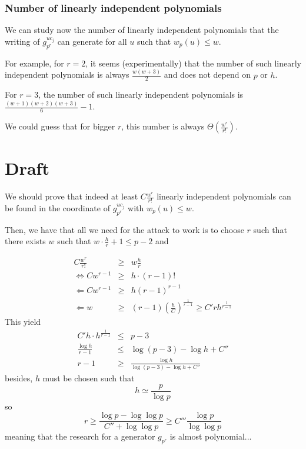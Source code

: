 \documentclass[12pt,a4paper,titlepage]{article}
\begin{document}
\subsubsection{Number of linearly independent polynomials}

We can study now the number of linearly independent polynomials that the writing of $g_{p^r}^{uc_j}$ can generate for all $u$ such that $w_p(u) \leq w$.

For example, for $r = 2$, it seems (experimentally) that the number of such linearly independent polynomials is always $\frac{w(w+3)}{2}$ and does not depend on $p$ or $h$.

For $r = 3$, the number of such linearly independent polynomials is $\frac{(w+1)(w+2)(w+3)}{6}-1$.

We could guess that for bigger $r$, this number is always $\Theta\left(\frac{w^r}{r!}\right)$.


\section{Draft}

We should prove that indeed at least $C\frac{w^r}{r!}$ linearly independent polynomials can be found in the coordinate of $g_{p^r}^{uc_j}$ with $w_p(u) \leq w$.

Then, we have that all we need for the attack to work is to choose $r$ such that there exists $w$ such that $w \cdot \frac{h}{r} + 1 \leq p-2$ and


\begin{eqnarray*}
C\frac{w^r}{r!} &\geq& w \frac{h}{r} \\
\Leftrightarrow C w^{r-1} &\geq& h\cdot (r-1)! \\
\Leftarrow C w^{r-1} &\geq& h (r-1)^{r-1} \\
\Leftarrow w &\geq& (r-1) \left(\frac{h}{C}\right)^{\frac{1}{r-1}} \geq C' r h^{\frac{1}{r-1}}
\end{eqnarray*}
This yield
\begin{eqnarray*}
C' h \cdot h^{\frac{1}{r-1}} &\leq& p-3 \\
\frac{\log h}{r-1} &\leq& \log (p-3) - \log h + C'' \\
r-1 &\geq& \frac{\log h}{\log(p-3) - \log h + C''} 
\end{eqnarray*}
besides, $h$ must be chosen such that
$$ h \simeq \frac{p}{\log p}$$
so
$$ r \geq \frac{\log p - \log \log p}{C'' + \log \log p} \geq C''' \frac{\log p}{\log\log p}$$
meaning that the research for a generator $g_{p^r}$ is almost polynomial...
\end{document}
